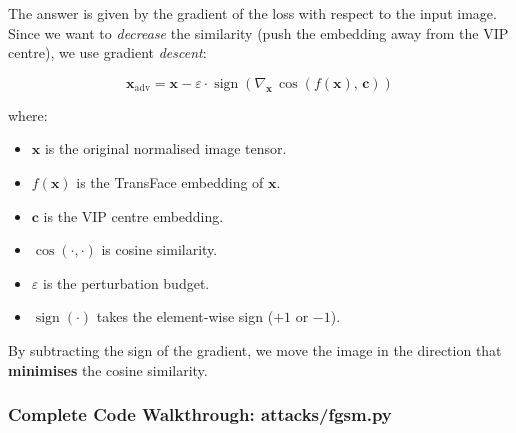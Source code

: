 \documentclass[12pt,a4paper]{article}
\newcommand{\sign}{\operatorname{sign}}
\begin{document}
The answer is given by the gradient of the loss with respect to the input image. Since we want to \textit{decrease} the similarity (push the embedding away from the VIP centre), we use gradient \textit{descent}:

\begin{equation}
\mathbf{x}_{\text{adv}} = \mathbf{x} - \varepsilon \cdot \sign\!\left(\nabla_{\mathbf{x}}\, \cos\!\left(f(\mathbf{x}),\, \mathbf{c}\right)\right)
\end{equation}

where:
\begin{itemize}
    \item $\mathbf{x}$ is the original normalised image tensor.
    \item $f(\mathbf{x})$ is the TransFace embedding of $\mathbf{x}$.
    \item $\mathbf{c}$ is the VIP centre embedding.
    \item $\cos(\cdot,\cdot)$ is cosine similarity.
    \item $\varepsilon$ is the perturbation budget.
    \item $\sign(\cdot)$ takes the element-wise sign ($+1$ or $-1$).
\end{itemize}

By subtracting the sign of the gradient, we move the image in the direction that \textbf{minimises} the cosine similarity.

\subsubsection{Complete Code Walkthrough: attacks/fgsm.py}
\end{document}
